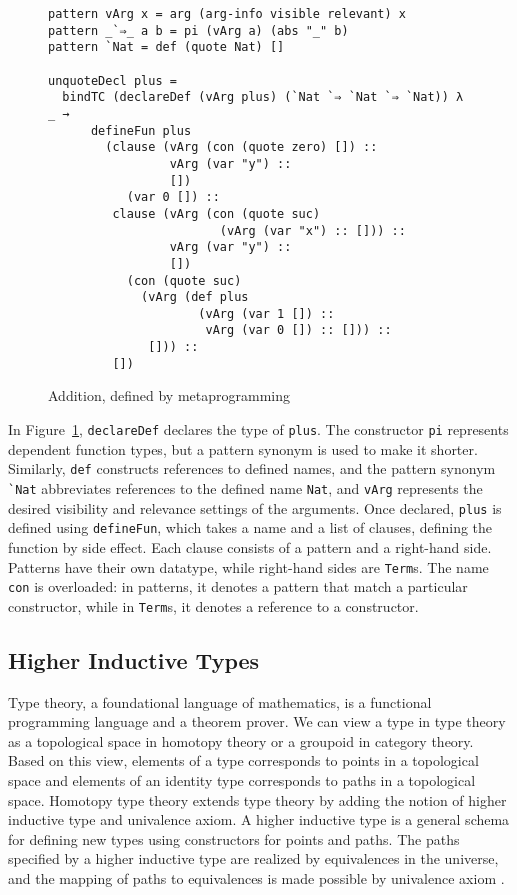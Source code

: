 \documentclass[sigplan,10pt]{acmart}
\begin{document}
\begin{figure}
\begingroup
\fontsize{7pt}{9pt}\selectfont
\begin{Verbatim}
pattern vArg x = arg (arg-info visible relevant) x
pattern _`⇒_ a b = pi (vArg a) (abs "_" b)
pattern `Nat = def (quote Nat) []

unquoteDecl plus =
  bindTC (declareDef (vArg plus) (`Nat `⇒ `Nat `⇒ `Nat)) λ _ → 
      defineFun plus
        (clause (vArg (con (quote zero) []) ::
                 vArg (var "y") ::
                 [])
           (var 0 []) ::
         clause (vArg (con (quote suc)
                        (vArg (var "x") :: [])) ::
                 vArg (var "y") ::
                 [])
           (con (quote suc)
             (vArg (def plus
                     (vArg (var 1 []) ::
                      vArg (var 0 []) :: [])) ::
              [])) ::
         [])
\end{Verbatim}
\endgroup
\caption{Addition, defined by metaprogramming}
\label{fig:plusmeta}
\end{figure}

In Figure~\ref{fig:plusmeta}, {\tt declareDef} declares the type of {\tt plus}.
The constructor {\tt pi} represents dependent function types, but a pattern synonym is used to make it shorter.
Similarly, \texttt{def} constructs references to defined names, and the pattern synonym \Verb|`Nat| abbreviates references to the defined name \texttt{Nat}, and {\tt vArg} represents the desired visibility and relevance settings of the arguments.
Once declared, \texttt{plus} is defined using {\tt defineFun}, which takes a name and a list of clauses, defining the function by side effect.
Each clause consists of a pattern and a right-hand side.
Patterns have their own datatype, while right-hand sides are \texttt{Term}s.
The name \texttt{con} is overloaded: in patterns, it denotes a pattern that match a particular constructor, while in \texttt{Term}s, it denotes a reference to a constructor.


\subsection{Higher Inductive Types}
\label{sec:sec2.2}

Type theory, a foundational language of mathematics, is a functional programming language and a theorem prover. We can view a type in type theory as a topological space in homotopy theory or a groupoid in category theory. Based on this view, elements of a type corresponds to points in a topological space and elements of an identity type corresponds to paths in a topological space. Homotopy type theory extends type theory by adding the notion of higher inductive type and univalence axiom. A higher inductive type is a general schema for defining new types using constructors for points and paths. The paths specified by a higher inductive type are realized by equivalences in the universe, and the mapping of paths to equivalences is made possible by univalence axiom \cite{HoTT-2013}.
\end{document}
